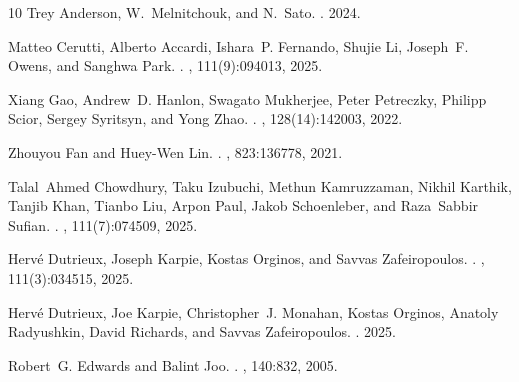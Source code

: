 \begin{thebibliography}{10}
Trey Anderson, W.~Melnitchouk, and N.~Sato.
.
 2024.

Matteo Cerutti, Alberto Accardi, Ishara~P. Fernando, Shujie Li, Joseph~F.
  Owens, and Sanghwa Park.
.
, 111(9):094013, 2025.

Xiang Gao, Andrew~D. Hanlon, Swagato Mukherjee, Peter Petreczky, Philipp Scior,
  Sergey Syritsyn, and Yong Zhao.
.
, 128(14):142003, 2022.

Zhouyou Fan and Huey-Wen Lin.
.
, 823:136778, 2021.

Talal~Ahmed Chowdhury, Taku Izubuchi, Methun Kamruzzaman, Nikhil Karthik,
  Tanjib Khan, Tianbo Liu, Arpon Paul, Jakob Schoenleber, and Raza~Sabbir
  Sufian.
.
, 111(7):074509, 2025.

Herv\'e Dutrieux, Joseph Karpie, Kostas Orginos, and Savvas Zafeiropoulos.
.
, 111(3):034515, 2025.

Herv\'e Dutrieux, Joe Karpie, Christopher~J. Monahan, Kostas Orginos, Anatoly
  Radyushkin, David Richards, and Savvas Zafeiropoulos.
.
 2025.

Robert~G. Edwards and Balint Joo.
.
, 140:832, 2005.

\end{thebibliography}
